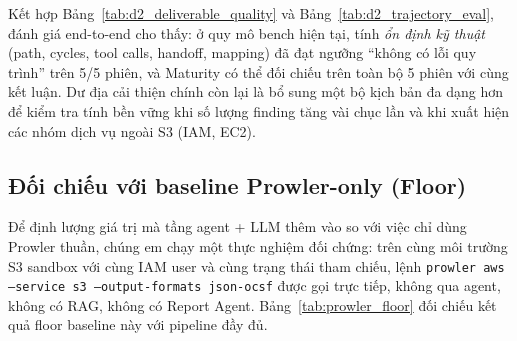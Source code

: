 Kết hợp Bảng~\ref{tab:d2_deliverable_quality} và Bảng~\ref{tab:d2_trajectory_eval}, đánh giá end-to-end cho thấy: ở quy mô bench hiện tại, tính \emph{ổn định kỹ thuật} (path, cycles, tool calls, handoff, mapping) đã đạt ngưỡng ``không có lỗi quy trình'' trên 5/5 phiên, và Maturity có thể đối chiếu trên toàn bộ 5 phiên với cùng kết luận. Dư địa cải thiện chính còn lại là bổ sung một bộ kịch bản đa dạng hơn để kiểm tra tính bền vững khi số lượng finding tăng vài chục lần và khi xuất hiện các nhóm dịch vụ ngoài S3 (IAM, EC2).

\subsection{Đối chiếu với baseline Prowler-only (Floor)}
\label{subsec:prowler_floor}

Để định lượng giá trị mà tầng agent + LLM thêm vào so với việc chỉ dùng Prowler thuần, chúng em chạy một thực nghiệm đối chứng: trên cùng môi trường S3 sandbox với cùng IAM user và cùng trạng thái tham chiếu, lệnh \texttt{prowler aws --service s3 --output-formats json-ocsf} được gọi trực tiếp, không qua agent, không có RAG, không có Report Agent. Bảng~\ref{tab:prowler_floor} đối chiếu kết quả floor baseline này với pipeline đầy đủ.

